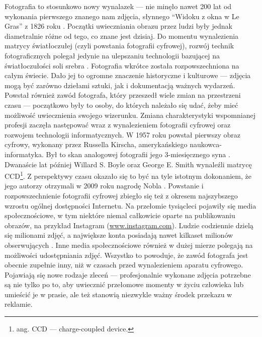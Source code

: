 \documentclass[12pt]{article}
\numberwithin{figure}{section}
\begin{document}
\begin{sloppypar}
Fotografia to stosunkowo nowy wynalazek --- nie minęło nawet 200 lat od wykonania pierwszego znanego nam zdjęcia, słynnego ``Widoku z okna w Le Gras'' z 1826 roku \cite{fotografia}. Początki uwieczniania obrazu przez ludzi były jednak diametralnie różne od tego, co znane jest dzisiaj. Do momentu wynalezienia matrycy światłoczułej (czyli powstania fotografii cyfrowej), rozwój technik fotograficznych polegał jedynie na ulepszaniu technologii bazującej na światłoczułości soli srebra \cite{fotografia}. Fotografia wkrótce została rozpowszechniona na całym świecie. Dało jej to ogromne znaczenie historyczne i kulturowe --- zdjęcia mogą być zarówno dziełami sztuki, jak i dokumentacją ważnych wydarzeń. Powstał również zawód fotografa, który przeszedł wiele zmian na przestrzeni czasu --- początkowo były to osoby, do których należało się udać, żeby mieć możliwość uwiecznienia swojego wizerunku. Zmiana charakterystyki wspomnianej profesji zaczęła następować wraz z wynalezieniem fotografii cyfrowej oraz rozwojem technologii informatycznych. W 1957 roku powstał pierwszy obraz cyfrowy, wykonany przez Russella Kirscha, amerykańskiego naukowca-informatyka. Był to skan analogowej fotografii jego 3-miesięcznego syna \cite{firstdigitalphoto}. Dwanaście lat później Willard S. Boyle oraz George E. Smith wynaleźli matrycę CCD\footnote{ang. CCD --- charge-coupled device.}. Z perspektywy czasu okazało się to być na tyle istotnym dokonaniem, że jego autorzy otrzymali w 2009 roku nagrodę Nobla \cite{nobelfoto}. Powstanie i rozpowszechnienie fotografii cyfrowej zbiegło się też z okresem najszybszego wzrostu ogólnej dostępności Internetu. Na przełomie tysiącleci pojawiły się media społecznościowe, w tym niektóre niemal całkowicie oparte na publikowaniu obrazów, na przykład Instagram (\url{www.instagram.com}). Ludzie codziennie dzielą się milionami zdjęć, a największe konta posiadają nawet kilkaset milionów obserwujących \cite{instagram}. Inne media społecznościowe również w dużej mierze polegają na możliwości udostępniania zdjęć. Wszystko to powoduje, że zawód fotografa jest obecnie zupełnie inny, niż w czasach przed wynalezieniem aparatu cyfrowego. Pojawiają się nowe rodzaje zleceń --- profesjonalnie wykonane zdjęcia potrzebne są nie tylko po to, aby uwiecznić przełomowe momenty w życiu człowieka lub umieścić je w prasie, ale też stanowią niezwykle ważny środek przekazu w reklamie. 


\end{sloppypar}
\end{document}
